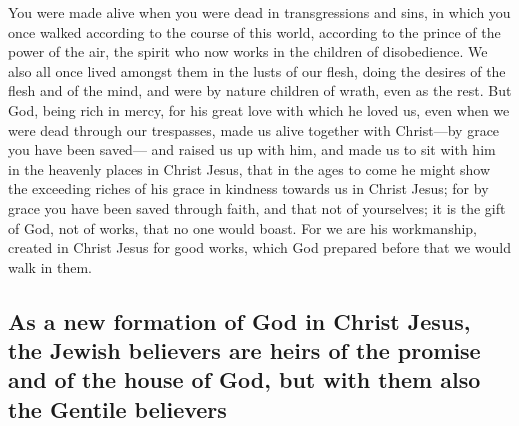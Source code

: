  You were made alive when you were dead in transgressions
and sins,  in which you once walked according to the
course of this world, according to the prince of the power of the air,
the spirit who now works in the children of disobedience. 
We also all once lived amongst them in the lusts of our flesh, doing the
desires of the flesh and of the mind, and were by nature children of
wrath, even as the rest.  But God, being rich in mercy,
for his great love with which he loved us,  even when we
were dead through our trespasses, made us alive together with
Christ---by grace you have been saved---  and raised us up
with him, and made us to sit with him in the heavenly places in Christ
Jesus,  that in the ages to come he might show the
exceeding riches of his grace in kindness towards us in Christ Jesus;
 for by grace you have been saved through faith, and that
not of yourselves; it is the gift of God,  not of works,
that no one would boast.  For we are his workmanship,
created in Christ Jesus for good works, which God prepared before that
we would walk in them.

\hypertarget{as-a-new-formation-of-god-in-christ-jesus-the-jewish-believers-are-heirs-of-the-promise-and-of-the-house-of-god-but-with-them-also-the-gentile-believers}{%
\subsection{As a new formation of God in Christ Jesus, the Jewish
believers are heirs of the promise and of the house of God, but with
them also the Gentile
believers}\label{as-a-new-formation-of-god-in-christ-jesus-the-jewish-believers-are-heirs-of-the-promise-and-of-the-house-of-god-but-with-them-also-the-gentile-believers}}

